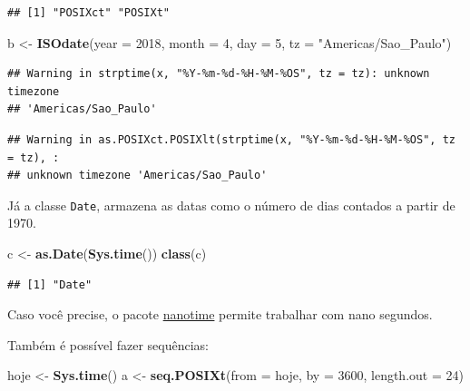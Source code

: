 \documentclass[]{book}
\newenvironment{Shaded}{\begin{snugshade}}{\end{snugshade}}
\newcommand{\KeywordTok}[1]{\textcolor[rgb]{0.13,0.29,0.53}{\textbf{#1}}}
\newcommand{\DataTypeTok}[1]{\textcolor[rgb]{0.13,0.29,0.53}{#1}}
\newcommand{\DecValTok}[1]{\textcolor[rgb]{0.00,0.00,0.81}{#1}}
\newcommand{\StringTok}[1]{\textcolor[rgb]{0.31,0.60,0.02}{#1}}
\newcommand{\NormalTok}[1]{#1}
\theoremstyle{definition}
\theoremstyle{definition}
\theoremstyle{definition}
\theoremstyle{remark}
\begin{document}
\begin{verbatim}
## [1] "POSIXct" "POSIXt"
\end{verbatim}

\begin{Shaded}
\begin{Highlighting}[]
\NormalTok{b <-}\StringTok{ }\KeywordTok{ISOdate}\NormalTok{(}\DataTypeTok{year =} \DecValTok{2018}\NormalTok{, }\DataTypeTok{month =} \DecValTok{4}\NormalTok{, }\DataTypeTok{day =} \DecValTok{5}\NormalTok{, }\DataTypeTok{tz =} \StringTok{"Americas/Sao_Paulo"}\NormalTok{)}
\end{Highlighting}
\end{Shaded}

\begin{verbatim}
## Warning in strptime(x, "%Y-%m-%d-%H-%M-%OS", tz = tz): unknown timezone
## 'Americas/Sao_Paulo'
\end{verbatim}

\begin{verbatim}
## Warning in as.POSIXct.POSIXlt(strptime(x, "%Y-%m-%d-%H-%M-%OS", tz = tz), :
## unknown timezone 'Americas/Sao_Paulo'
\end{verbatim}

Já a classe \texttt{Date}, armazena as datas como o número de dias
contados a partir de 1970.

\begin{Shaded}
\begin{Highlighting}[]
\NormalTok{c <-}\StringTok{ }\KeywordTok{as.Date}\NormalTok{(}\KeywordTok{Sys.time}\NormalTok{())}
\KeywordTok{class}\NormalTok{(c)}
\end{Highlighting}
\end{Shaded}

\begin{verbatim}
## [1] "Date"
\end{verbatim}

Caso você precise, o pacote
\href{https://github.com/eddelbuettel/nanotime}{nanotime} permite
trabalhar com nano segundos.

Também é possível fazer sequências:

\begin{Shaded}
\begin{Highlighting}[]
\NormalTok{hoje <-}\StringTok{ }\KeywordTok{Sys.time}\NormalTok{()}
\NormalTok{a <-}\StringTok{ }\KeywordTok{seq.POSIXt}\NormalTok{(}\DataTypeTok{from =}\NormalTok{ hoje, }\DataTypeTok{by =} \DecValTok{3600}\NormalTok{, }\DataTypeTok{length.out =} \DecValTok{24}\NormalTok{)}
\end{Highlighting}
\end{Shaded}
\end{document}
